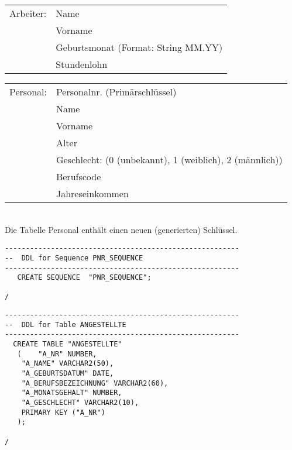 \documentclass{scrartcl}
\begin{document}
\begin{tabular}{l l}
Arbeiter: & Name \\
& Vorname \\
& Geburtsmonat (Format: String MM.YY) \\
& Stundenlohn \\
\end{tabular}

\begin{tabular}{l l}
Personal: & Personalnr. (Primärschlüssel) \\
 & Name \\
 & Vorname \\
 & Alter \\
 & Geschlecht: (0 (unbekannt), 1 (weiblich), 2 (männlich)) \\
 & Berufscode \\
 & Jahreseinkommen \\
\end{tabular}
\\
Die Tabelle Personal enthält einen neuen (generierten) Schlüssel. 
\begin{lstlisting}
--------------------------------------------------------
--  DDL for Sequence PNR_SEQUENCE
--------------------------------------------------------
   CREATE SEQUENCE  "PNR_SEQUENCE";

/
\end{lstlisting}

\begin{lstlisting}
--------------------------------------------------------
--  DDL for Table ANGESTELLTE
--------------------------------------------------------
  CREATE TABLE "ANGESTELLTE" 
   (	"A_NR" NUMBER, 
	"A_NAME" VARCHAR2(50), 
	"A_GEBURTSDATUM" DATE, 
	"A_BERUFSBEZEICHNUNG" VARCHAR2(60), 
	"A_MONATSGEHALT" NUMBER, 
	"A_GESCHLECHT" VARCHAR2(10),
	PRIMARY KEY ("A_NR")
   );

/
\end{lstlisting}
\end{document}
